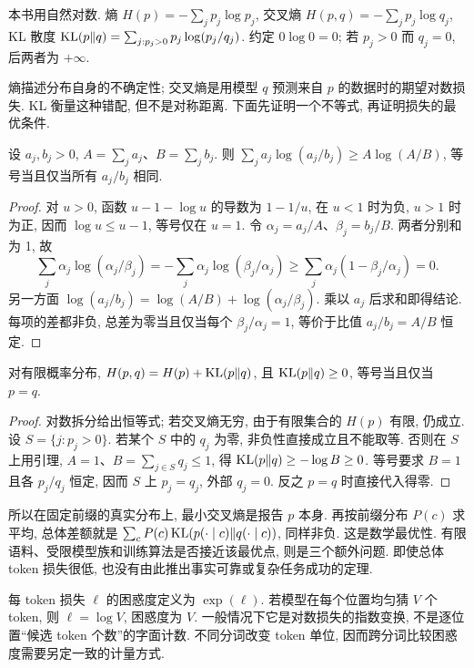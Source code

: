 \begin{definition}
本书用自然对数. 熵 $H(p)=-\sum_jp_j\log p_j$, 交叉熵 $H(p,q)=-\sum_jp_j\log q_j$, KL 散度
$\operatorname{KL}(p\Vert q)=\sum_{j:p_j>0}p_j\log(p_j/q_j)$.
约定 $0\log0=0$; 若 $p_j>0$ 而 $q_j=0$, 后两者为 $+\infty$.
\end{definition}
熵描述分布自身的不确定性; 交叉熵是用模型 $q$ 预测来自 $p$ 的数据时的期望对数损失. KL 衡量这种错配, 但不是对称距离. 下面先证明一个不等式, 再证明损失的最优条件.

\begin{lemma}[对数和不等式]\label{lem:logsum}
设 $a_j,b_j>0$, $A=\sum_ja_j$、$B=\sum_jb_j$. 则
$\sum_ja_j\log(a_j/b_j)\ge A\log(A/B)$,
等号当且仅当所有 $a_j/b_j$ 相同.
\end{lemma}
\begin{proof}
对 $u>0$, 函数 $u-1-\log u$ 的导数为 $1-1/u$, 在 $u<1$ 时为负, $u>1$ 时为正, 因而 $\log u\le u-1$, 等号仅在 $u=1$. 令 $\alpha_j=a_j/A$、$\beta_j=b_j/B$. 两者分别和为 1, 故
\[
\sum_j\alpha_j\log(\alpha_j/\beta_j)
=-\sum_j\alpha_j\log(\beta_j/\alpha_j)
\ge\sum_j\alpha_j(1-\beta_j/\alpha_j)=0.
\]
另一方面 $\log(a_j/b_j)=\log(A/B)+\log(\alpha_j/\beta_j)$. 乘以 $a_j$ 后求和即得结论. 每项的差都非负, 总差为零当且仅当每个 $\beta_j/\alpha_j=1$, 等价于比值 $a_j/b_j=A/B$ 恒定.
\end{proof}
\begin{proposition}\label{prop:kl}
对有限概率分布, $H(p,q)=H(p)+\operatorname{KL}(p\Vert q)$, 且 $\operatorname{KL}(p\Vert q)\ge0$, 等号当且仅当 $p=q$.
\end{proposition}
\begin{proof}
对数拆分给出恒等式; 若交叉熵无穷, 由于有限集合的 $H(p)$ 有限, 仍成立. 设 $S=\{j:p_j>0\}$. 若某个 $S$ 中的 $q_j$ 为零, 非负性直接成立且不能取等. 否则在 $S$ 上用引理, $A=1$、$B=\sum_{j\in S}q_j\le1$, 得 $\operatorname{KL}(p\Vert q)\ge-\log B\ge0$. 等号要求 $B=1$ 且各 $p_j/q_j$ 恒定, 因而 $S$ 上 $p_j=q_j$, 外部 $q_j=0$. 反之 $p=q$ 时直接代入得零.
\end{proof}
所以在固定前缀的真实分布上, 最小交叉熵是报告 $p$ 本身. 再按前缀分布 $P(c)$ 求平均, 总体差额就是 $\sum_cP(c)\operatorname{KL}(p(\cdot\mid c)\Vert q(\cdot\mid c))$, 同样非负. 这是数学最优性. 有限语料、受限模型族和训练算法是否接近该最优点, 则是三个额外问题. 即使总体 token 损失很低, 也没有由此推出事实可靠或复杂任务成功的定理.

每 token 损失 $\ell$ 的困惑度定义为 $\exp(\ell)$. 若模型在每个位置均匀猜 $V$ 个 token, 则 $\ell=\log V$, 困惑度为 $V$. 一般情况下它是对数损失的指数变换, 不是逐位置“候选 token 个数”的字面计数. 不同分词改变 token 单位, 因而跨分词比较困惑度需要另定一致的计量方式.

